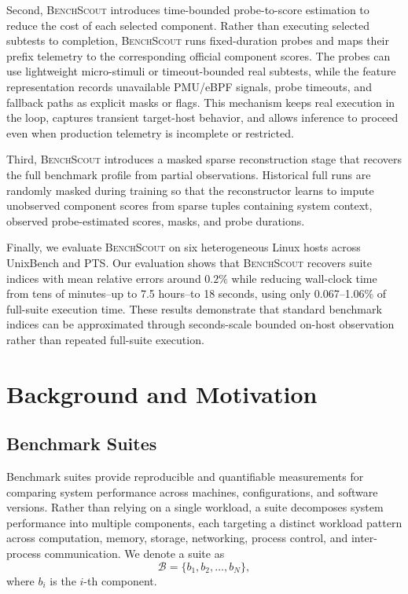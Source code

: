 \documentclass[sigplan,10pt]{acmart}
\newcommand{\ourmethod}{\textsc{BenchScout}\xspace}
\begin{document}
Second, \ourmethod{} introduces time-bounded probe-to-score estimation to reduce the cost of each selected component.
Rather than executing selected subtests to completion, \ourmethod{} runs fixed-duration probes and maps their prefix telemetry to the corresponding official component scores.
The probes can use lightweight micro-stimuli or timeout-bounded real subtests, while the feature representation records unavailable PMU/eBPF signals, probe timeouts, and fallback paths as explicit masks or flags.
This mechanism keeps real execution in the loop, captures transient target-host behavior, and allows inference to proceed even when production telemetry is incomplete or restricted.

Third, \ourmethod{} introduces a masked sparse reconstruction stage that recovers the full benchmark profile from partial observations.
Historical full runs are randomly masked during training so that the reconstructor learns to impute unobserved component scores from sparse tuples containing system context, observed probe-estimated scores, masks, and probe durations.

Finally, we evaluate \ourmethod{} on six heterogeneous Linux hosts across UnixBench and PTS.
Our evaluation shows that \ourmethod{} recovers suite indices with mean relative errors around \(0.2\%\) while reducing wall-clock time from tens of minutes--up to 7.5 hours--to 18 seconds, using only 0.067--1.06\% of full-suite execution time.
These results demonstrate that standard benchmark indices can be approximated through seconds-scale bounded on-host observation rather than repeated full-suite execution.



\section{Background and Motivation}

\subsection{Benchmark Suites}

Benchmark suites provide reproducible and quantifiable measurements for comparing system performance across machines, configurations, and software versions. Rather than relying on a single workload, a suite decomposes system performance into multiple components, each targeting a distinct workload pattern across computation, memory, storage, networking, process control, and inter-process communication. We denote a suite as
\begin{equation}
\label{eq:suite}
\mathcal{B}=\{b_1,b_2,\ldots,b_N\},
\end{equation}
where \(b_i\) is the \(i\)-th component.
\end{document}
